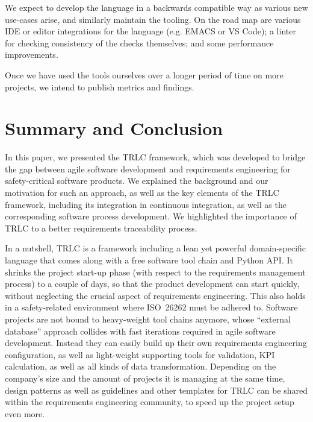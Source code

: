 \documentclass[english]{lni}
\begin{document}
We expect to develop the language in a backwards compatible way as
various new use-cases arise, and similarly maintain the tooling. On
the road map are various IDE or editor integrations for the language
(e.g. EMACS or VS Code); a linter for checking consistency of the
checks themselves; and some performance improvements.

Once we have used the tools ourselves over a longer period of time on
more projects, we intend to publish metrics and findings.

\section{Summary and Conclusion}
In this paper, we presented the TRLC framework, which was developed to
bridge the gap between agile software development and requirements
engineering for safety-critical software products. We explained the
background and our motivation for such an approach, as well as the key
elements of the TRLC framework, including its integration in
continuous integration, as well as the corresponding software process
development. We highlighted the importance of TRLC to a better
requirements traceability process.

In a nutshell, TRLC is a framework including a lean yet powerful
domain-specific language that comes along with a free software tool
chain and Python API.  It shrinks the project start-up phase (with
respect to the requirements management process) to a couple of days,
so that the product development can start quickly, without neglecting
the crucial aspect of requirements engineering.  This also holds in a
safety-related environment where ISO~26262 must be adhered to.
Software projects are not bound to heavy-weight tool chains anymore,
whose ``external database'' approach collides with fast iterations
required in agile software development. Instead they can easily build
up their own requirements engineering configuration, as well as
light-weight supporting tools for validation, KPI calculation, as well
as all kinds of data transformation. Depending on the company's size
and the amount of projects it is managing at the same time, design
patterns as well as guidelines and other templates for TRLC can be
shared within the requirements engineering community, to speed up the
project setup even more.


\end{document}
